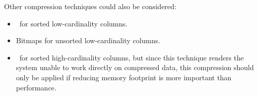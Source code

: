 Other compression techniques could also be considered:
\begin{itemize}
  \item \rle~for sorted low-cardinality columns.
  \item Bitmaps for unsorted low-cardinality columns.
  \item \de~for sorted high-cardinality columns, but since this technique renders the system unable to work directly on compressed data, this compression should only be applied if reducing memory footprint is more important than performance.
\end{itemize}
